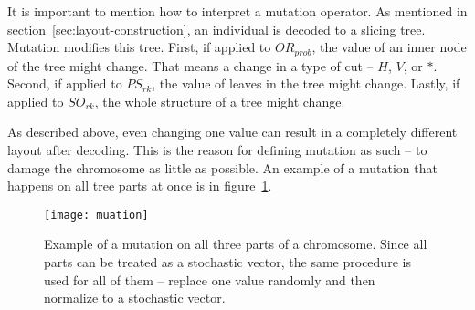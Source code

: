 It is important to mention how to interpret a mutation operator.
As mentioned in section~\ref{sec:layout-construction}, an individual is decoded to a slicing tree.
Mutation modifies this tree.
First, if applied to $OR_{prob}$, the value of an inner node of the tree might change.
That means a change in a type of cut – $H$, $V$, or $*$.
Second, if applied to $PS_{rk}$, the value of leaves in the tree might change.
Lastly, if applied to $SO_{rk}$, the whole structure of a tree might change.

As described above, even changing one value can result in a completely different layout after decoding.
This is the reason for defining mutation as such – to damage the chromosome as little as possible.
An example of a mutation that happens on all tree parts at once is in figure~\ref{fig:mutation}.


\begin{figure}[!htp]
    \texttt{[image: muation]}\caption{
        Example of a mutation on all three parts of a chromosome.
        Since all parts can be treated as a stochastic vector, the same procedure
        is used for all of them – replace one value randomly and then normalize to a stochastic vector.
    }
    \label{fig:mutation}
\end{figure}

